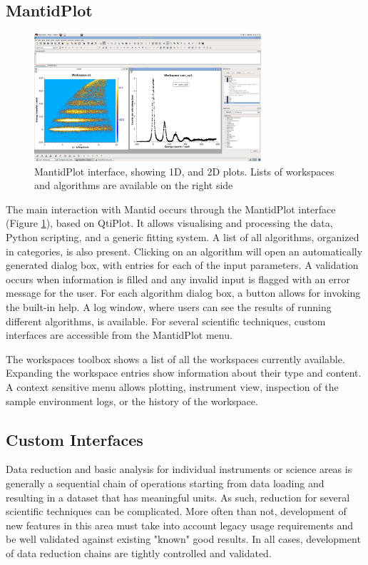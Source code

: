 \documentclass[1p]{elsarticle}
\begin{document}
\subsection{MantidPlot}
\begin{figure}[!b]
\centerline{\includegraphics[width=0.75\textwidth]{MantidPlot.pdf}}
\caption{MantidPlot interface, showing 1D, and 2D plots. Lists of workspaces and algorithms are available on the right side}
\label{fig:MantidPlot}
\end{figure}
The main interaction with Mantid occurs through the MantidPlot interface (Figure \ref{fig:MantidPlot}), based on QtiPlot\cite{qtiplot}. It allows visualising and processing the data, Python scripting, and a generic fitting system.
A list of all algorithms, organized in categories, is also present. Clicking on an algorithm will open an automatically generated dialog box, with entries for each of the input parameters. A validation occurs when information is filled and any invalid input is flagged with an error message for the user. For each algorithm dialog box, a button allows for invoking the built-in help. A log window, where users can see the results of running different algorithms, is available. For several scientific techniques, custom interfaces are accessible from the MantidPlot menu.


The workspaces toolbox shows a list of all the workspaces currently available. Expanding the workspace entries show information about their type and content. A context sensitive menu allows plotting, instrument view, inspection of the sample environment logs, or the history of the workspace. 


\subsection{Custom Interfaces}

Data reduction and basic analysis for individual instruments or science areas is generally a sequential chain of operations starting from data loading and resulting in a dataset that has meaningful units. As such, reduction for several scientific techniques can be complicated. More often than not, development of new features in this area must take into account legacy usage requirements and be well validated against existing "known" good results. In all cases, development of data reduction chains are tightly controlled and validated. 
\end{document}
